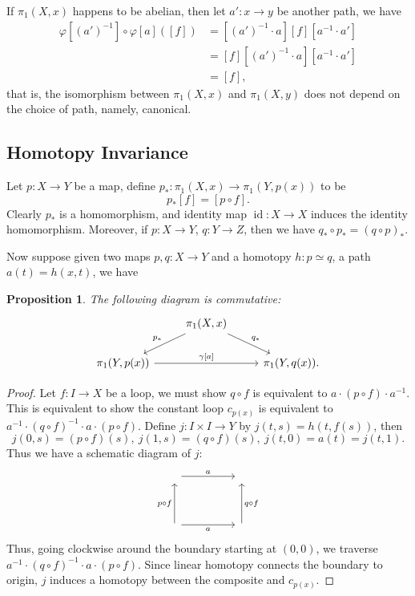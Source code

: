 \documentclass[a4paper]{amsart}
\theoremstyle{plain}
\newtheorem{prop}[thm]{Proposition}
\theoremstyle{definition}
\theoremstyle{remark}
\begin{document}
If $\pi_1(X,x)$ happens to be abelian, then let $a':x\to y$ be another path, we have
\begin{align*}
    \varphi[(a')^{-1}]\circ\varphi[a]([f])&=[(a')^{-1}\cdot a][f][a^{-1}\cdot a']\\
    &=[f][(a')^{-1}\cdot a][a^{-1}\cdot a']\\
    &=[f],
\end{align*}
that is, the isomorphism between $\pi_1(X,x)$ and $\pi_1(X,y)$ does not depend on the choice of path, namely, canonical.

\subsection{Homotopy Invariance}

Let $p:X\to Y$ be a map, define $p_*:\pi_1(X,x)\to\pi_1(Y,p(x))$ to be
\[p_*[f]=[p\circ f].\]
Clearly $p_*$ is a homomorphism, and identity map $\operatorname{id}:X\to X$ induces the identity homomorphism.
Moreover, if $p:X\to Y$, $q:Y\to Z$, then we have $q_*\circ p_*=(q\circ p)_*$.

Now suppose given two maps $p,q:X\to Y$ and a homotopy $h:p\simeq q$, a path $a(t)=h(x,t)$, we have
\begin{prop}
    The following diagram is commutative:
    \[\begin{tikzcd}
         & \pi_1(X,x) \ar[dl, "{p_*}"'] \ar[dr, "{q_*}"] & \\
        \pi_1(Y,p(x)) \ar[rr, "{\gamma[a]}"] & & \pi_1(Y,q(x)).
    \end{tikzcd}\]
\end{prop}
\begin{proof}
    Let $f:I\to X$ be a loop, we must show $q\circ f$ is equivalent to $a\cdot(p\circ f)\cdot a^{-1}$.
    This is equivalent to show the constant loop $c_{p(x)}$ is equivalent to $a^{-1}\cdot(q\circ f)^{-1}\cdot a\cdot(p\circ f)$.
    Define $j:I\times I\to Y$ by $j(t,s)=h(t,f(s))$, then
    \[j(0,s)=(p\circ f)(s),\ j(1,s)=(q\circ f)(s),\ j(t,0)=a(t)=j(t,1).\]
    Thus we have a schematic diagram of $j$:
    \[\begin{tikzcd}[sep=huge]
        \ \ar[r, "a"] & \ \\
        \ \ar[u, "{p\circ f}"] \ar[r, "a"'] & \ \ar[u, "{q\circ f}"']
    \end{tikzcd}\]
    Thus, going clockwise around the boundary starting at $(0,0)$, we traverse $a^{-1}\cdot(q\circ f)^{-1}\cdot a\cdot(p\circ f)$.
    Since linear homotopy connects the boundary to origin, $j$ induces a homotopy between the composite and $c_{p(x)}$.
\end{proof}
\end{document}
